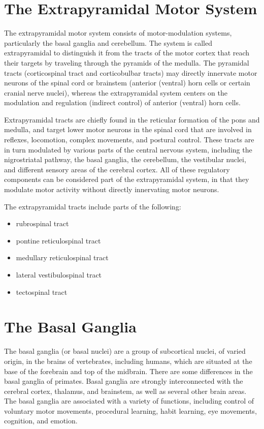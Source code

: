 \documentclass[]{book}
\providecommand{\tightlist}{%
  \setlength{\itemsep}{0pt}\setlength{\parskip}{0pt}}
\begin{document}
\hypertarget{the-extrapyramidal-motor-system}{%
\section{The Extrapyramidal Motor System}\label{the-extrapyramidal-motor-system}}

The extrapyramidal motor system consists of motor-modulation systems, particularly the basal ganglia and cerebellum. The system is called extrapyramidal to distinguish it from the tracts of the motor cortex that reach their targets by traveling through the pyramids of the medulla. The pyramidal tracts (corticospinal tract and corticobulbar tracts) may directly innervate motor neurons of the spinal cord or brainstem (anterior (ventral) horn cells or certain cranial nerve nuclei), whereas the extrapyramidal system centers on the modulation and regulation (indirect control) of anterior (ventral) horn cells.

Extrapyramidal tracts are chiefly found in the reticular formation of the pons and medulla, and target lower motor neurons in the spinal cord that are involved in reflexes, locomotion, complex movements, and postural control. These tracts are in turn modulated by various parts of the central nervous system, including the nigrostriatal pathway, the basal ganglia, the cerebellum, the vestibular nuclei, and different sensory areas of the cerebral cortex. All of these regulatory components can be considered part of the extrapyramidal system, in that they modulate motor activity without directly innervating motor neurons.

The extrapyramidal tracts include parts of the following:

\begin{itemize}
\tightlist
\item
  rubrospinal tract
\item
  pontine reticulospinal tract
\item
  medullary reticulospinal tract
\item
  lateral vestibulospinal tract
\item
  tectospinal tract
\end{itemize}

\hypertarget{the-basal-ganglia-1}{%
\section{The Basal Ganglia}\label{the-basal-ganglia-1}}

The basal ganglia (or basal nuclei) are a group of subcortical nuclei, of varied origin, in the brains of vertebrates, including humans, which are situated at the base of the forebrain and top of the midbrain. There are some differences in the basal ganglia of primates. Basal ganglia are strongly interconnected with the cerebral cortex, thalamus, and brainstem, as well as several other brain areas. The basal ganglia are associated with a variety of functions, including control of voluntary motor movements, procedural learning, habit learning, eye movements, cognition, and emotion.
\end{document}
